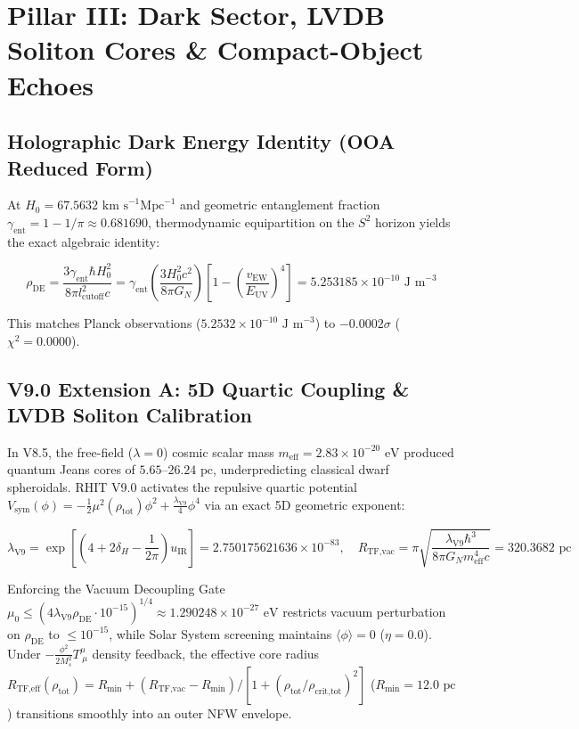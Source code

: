 \documentclass[11pt, a4paper]{article}
\begin{document}
\section{Pillar III: Dark Sector, LVDB Soliton Cores \& Compact-Object Echoes}

\subsection{Holographic Dark Energy Identity (OOA Reduced Form)}

At $H_0 = 67.5632\text{ km s}^{-1}\text{Mpc}^{-1}$ and geometric entanglement fraction $\gamma_{\text{ent}} = 1 - 1/\pi \approx 0.681690$, thermodynamic equipartition on the $S^2$ horizon yields the exact algebraic identity:

\begin{equation}
\rho_{\text{DE}} = \frac{3\gamma_{\text{ent}} \hbar H_0^2}{8\pi l_{\text{cutoff}}^2 c} = \gamma_{\text{ent}} \left(\frac{3 H_0^2 c^2}{8\pi G_N}\right) \left[ 1 - \left(\frac{v_{\text{EW}}}{E_{\text{UV}}}\right)^4 \right] = 5.253185 \times 10^{-10}\text{ J m}^{-3}
\end{equation}

This matches Planck observations ($5.2532 \times 10^{-10}\text{ J m}^{-3}$) to $-0.0002\sigma$ ($\chi^2 = 0.0000$).

\subsection{V9.0 Extension A: 5D Quartic Coupling \& LVDB Soliton Calibration}

In V8.5, the free-field ($\lambda = 0$) cosmic scalar mass $m_{\text{eff}} = 2.83 \times 10^{-20}\text{ eV}$ produced quantum Jeans cores of $5.65\text{--}26.24\text{ pc}$, underpredicting classical dwarf spheroidals. RHIT V9.0 activates the repulsive quartic potential $V_{\text{sym}}(\phi) = -\frac{1}{2}\mu^2(\rho_{\text{tot}})\phi^2 + \frac{\lambda_{\text{V9}}}{4}\phi^4$ via an exact 5D geometric exponent:

\begin{equation}
\lambda_{\text{V9}} = \exp\left[\left(4 + 2\delta_H - \frac{1}{2\pi}\right) u_{\text{IR}}\right] = 2.750175621636 \times 10^{-83}, \quad
R_{\text{TF,vac}} = \pi \sqrt{\frac{\lambda_{\text{V9}} \hbar^3}{8\pi G_N m_{\text{eff}}^4 c}} = 320.3682\text{ pc}
\end{equation}

Enforcing the Vacuum Decoupling Gate $\mu_0 \le (4\lambda_{\text{V9}}\rho_{\text{DE}}\cdot 10^{-15})^{1/4} \approx 1.290248 \times 10^{-27}\text{ eV}$ restricts vacuum perturbation on $\rho_{\text{DE}}$ to $\le 10^{-15}$, while Solar System screening maintains $\langle\phi\rangle = 0$ ($\eta = 0.0$). Under $-\frac{\phi^2}{2M_s^2}T^\mu_{\ \mu}$ density feedback, the effective core radius $R_{\text{TF,eff}}(\rho_{\text{tot}}) = R_{\text{min}} + (R_{\text{TF,vac}} - R_{\text{min}})/[1 + (\rho_{\text{tot}}/\rho_{\text{crit,tot}})^2]$ ($R_{\text{min}} = 12.0\text{ pc}$) transitions smoothly into an outer NFW envelope.
\end{document}
